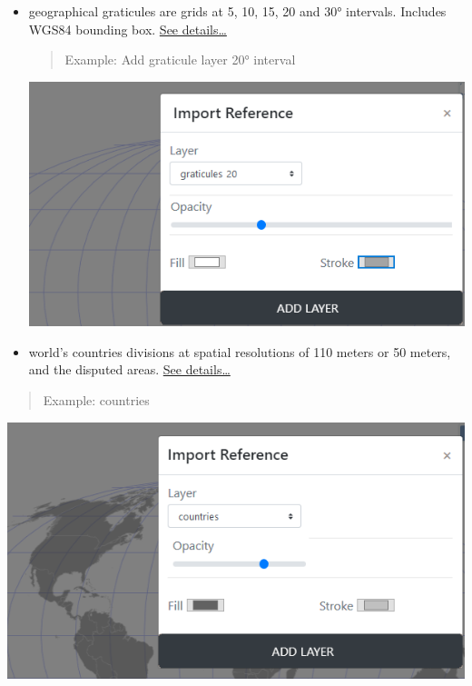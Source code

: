 \documentclass[
  letterpaper,
  DIV=11,
  numbers=noendperiod]{scrreprt}
\begin{document}
\begin{itemize}
\item
  geographical graticules are grids at 5, 10, 15, 20 and 30° intervals.
  Includes WGS84 bounding box.
  \href{https://www.naturalearthdata.com/downloads/50m-physical-vectors/50m-graticules/}{See
  details\ldots{}}

  \begin{quote}
  Example: Add graticule layer 20° interval
  \end{quote}

  \begin{center}
  \includegraphics{images/Add_reference_Layer_Graticule.png}
  \end{center}
\item
  world's countries divisions at spatial resolutions of 110 meters or 50
  meters, and the disputed areas.
  \href{https://www.naturalearthdata.com/downloads/10m-cultural-vectors/10m-admin-0-countries/}{See
  details\ldots{}}
\end{itemize}

\begin{quote}
Example: countries
\end{quote}

\begin{center}
\includegraphics{images/Add_reference_Layer_Country.png}
\end{center}
\end{document}

